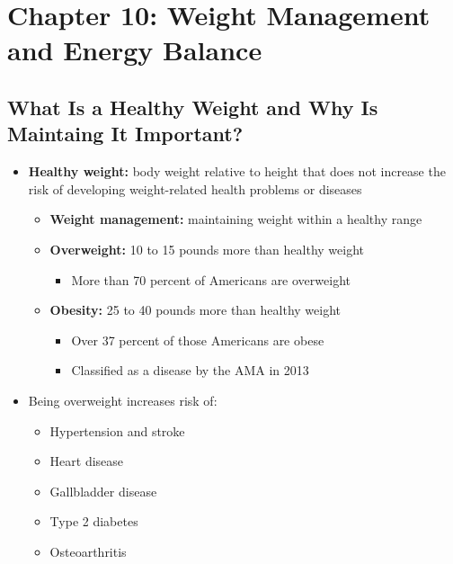 \documentclass[12pt]{article}
\begin{document}
    \section{Chapter 10: Weight Management and Energy Balance}
        
        \subsection{What Is a Healthy Weight and Why Is Maintaing It Important?}
            \begin{itemize}
                \item \textbf{Healthy weight:} body weight relative to height that does not increase the risk of developing weight-related health problems or diseases
                    \begin{itemize}
                        \item \textbf{Weight management:} maintaining weight within a healthy range
                        \item \textbf{Overweight:} 10 to 15 pounds more than healthy weight
                            \begin{itemize}
                                \item More than 70 percent of Americans are overweight
                            \end{itemize}
                        \item \textbf{Obesity:} 25 to 40 pounds more than healthy weight
                            \begin{itemize}
                                \item Over 37 percent of those Americans are obese
                                \item Classified as a disease by the AMA in 2013
                            \end{itemize}
                    \end{itemize}
                \item Being overweight increases risk of:
                    \begin{itemize}
                        \item Hypertension and stroke
                        \item Heart disease
                        \item Gallbladder disease
                        \item Type 2 diabetes
                        \item Osteoarthritis

\end{itemize}
\end{itemize}
\end{document}
